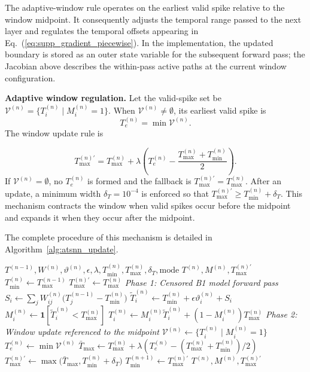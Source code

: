 \documentclass[12pt]{article}
\newcommand{\rev}[1]{\textcolor{blue}{#1}}
\begin{document}
 The adaptive-window rule operates on the earliest valid spike relative to the window midpoint. It consequently adjusts the temporal range passed to the next layer and regulates the temporal offsets appearing in Eq.~(\ref{eq:supp_gradient_piecewise}). In the implementation, the updated boundary is stored as an outer state variable for the subsequent forward pass; the Jacobian above describes the within-pass active paths at the current window configuration.

\textbf{Adaptive window regulation.}
Let the valid-spike set be $\mathcal{V}^{(n)}=\{T_i^{(n)}\mid M_i^{(n)}=1\}$. When $\mathcal{V}^{(n)}\neq\emptyset$, its earliest valid spike is
\[
T_e^{(n)}=\min \mathcal{V}^{(n)}.
\]
 The window update rule is

\begin{equation}
T_{\max}^{(n)\prime} =
T_{\max}^{(n)}
+
\lambda
\left(
T_e^{(n)} -
\frac{T_{\max}^{(n)}+T_{\min}^{(n)}}{2}
\right).
\label{eq:supp_window_update}
\end{equation}
If $\mathcal{V}^{(n)}=\emptyset$, no $T_e^{(n)}$ is formed and the fallback is $T_{\max}^{(n)\prime}=T_{\max}^{(n)}$. After an update, a minimum width $\delta_T=10^{-4}$ is enforced so that $T_{\max}^{(n)\prime}\ge T_{\min}^{(n)}+\delta_T$. This mechanism contracts the window when valid spikes occur before the midpoint and expands it when they occur after the midpoint.

The complete procedure of this mechanism is detailed in Algorithm~\ref{alg:atsnn_update}.

\begin{algorithm}[H]
\caption{Forward pass and adaptive temporal window \rev{update.}}
\label{alg:atsnn_update}
\begin{algorithmic}[1]
 \Require  $T^{(n-1)},W^{(n)},\vartheta^{(n)},\epsilon,\lambda,T_{\min}^{(n)},T_{\max}^{(n)},\delta_T,\mathrm{mode}$
\Ensure  $T^{(n)},M^{(n)},T_{\max}^{(n)\prime}$
\State  $T_{\min}^{(n)}\gets T_{\max}^{(n-1)}$ 
\State $T_{\max}^{(n)\prime}\gets T_{\max}^{(n)}$ 
     \Statex \textit{Phase 1: Censored B1 model forward pass}
     \State  $S_i\gets\sum_j W_{ij}^{(n)}\bigl(T_j^{(n-1)}-T_{\min}^{(n)}\bigr)$
    \State  $\tilde{T}_i^{(n)}\gets T_{\min}^{(n)}+\epsilon\vartheta_i^{(n)}+S_i$
    \State  $M_i^{(n)}\gets\mathbf{1}[\tilde{T}_i^{(n)}<T_{\max}^{(n)}]$
    \State $T_i^{(n)}\gets M_i^{(n)}\tilde{T}_i^{(n)}+(1-M_i^{(n)})T_{\max}^{(n)}$
\EndFor
     \Statex \textit{Phase 2: Window update referenced to the midpoint}
    \State  $\mathcal{V}^{(n)}\gets\{T_i^{(n)}\mid M_i^{(n)}=1\}$
        \State  $T_e^{(n)}\gets\min\mathcal{V}^{(n)}$
        \State  $\bar{T}_{\max}\gets T_{\max}^{(n)}+\lambda\left(T_e^{(n)}-(T_{\max}^{(n)}+T_{\min}^{(n)})/2\right)$
        \State  $T_{\max}^{(n)\prime}\gets\max\bigl(\bar{T}_{\max},T_{\min}^{(n)}+\delta_T\bigr)$
    \EndIf
 \EndIf
\State $T_{\min}^{(n+1)}\gets T_{\max}^{(n)\prime}$
\State \Return  $T^{(n)},M^{(n)},T_{\max}^{(n)\prime}$
\end{algorithmic}
\end{algorithm}
\end{document}

